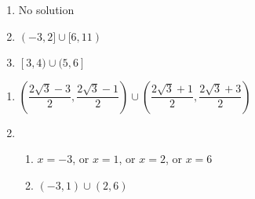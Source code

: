 \documentclass{ximera}
\begin{document}
\begin{multicols}{3}
\begin{enumerate}
\setcounter{enumi}{\value{HW}}

\item No solution 
\item $(-3,2] \cup [6,11)$

\item $[3, 4) \cup (5, 6]$

\setcounter{HW}{\value{enumi}}
\end{enumerate}
\end{multicols}

\begin{enumerate}
\setcounter{enumi}{\value{HW}}

\item $\left(\dfrac{2 \sqrt{3} - 3}{2},  \dfrac{2 \sqrt{3} - 1}{2}   \right) \cup \left(\dfrac{2 \sqrt{3} +1}{2},  \dfrac{2 \sqrt{3} +3}{2}   \right)$

\item  \begin{enumerate} \item $x = -3$, or $x = 1$, or $x = 2$, or $x = 6$

\item $(-3,1) \cup (2,6)$

\end{enumerate}

\setcounter{HW}{\value{enumi}}
\end{enumerate}
\end{document}
